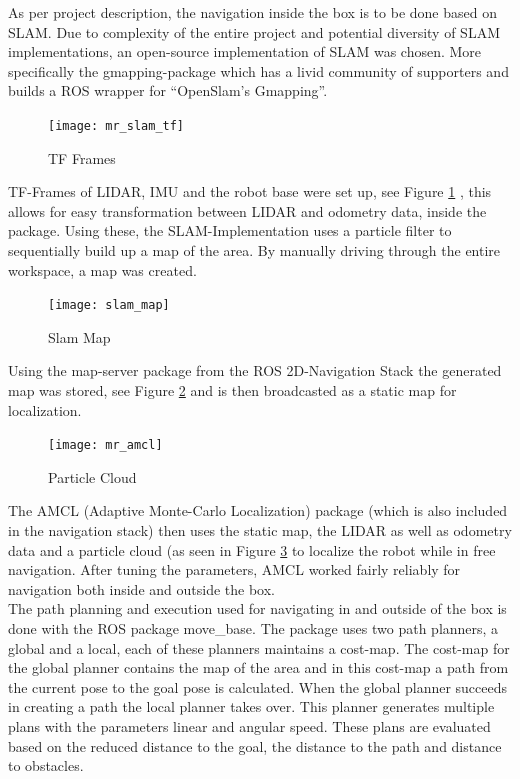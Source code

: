     As per project description, the navigation inside the box is to be done based on SLAM. 
    Due to complexity of the entire project and potential diversity of SLAM implementations, an open-source implementation of SLAM was chosen. 
    More specifically the gmapping-package \cite{gmapping} which has a livid community of supporters and builds a ROS wrapper for “OpenSlam's Gmapping”\cite{openslam}. 
	\begin{figure}[H]
        \centering
        \texttt{[image: mr\_slam\_tf]}
        \caption{TF Frames}
        \label{fig:tf_frames}
    \end{figure}
    TF-Frames of LIDAR, IMU and the robot base were set up, see Figure \ref{fig:tf_frames} , this allows for easy transformation between LIDAR and odometry data, inside the package. 
    Using these, the SLAM-Implementation uses a particle filter to sequentially build up a map of the area. 
    By manually driving through the entire workspace, a map was created. 
    \begin{figure}[H]
        \centering
        \texttt{[image: slam\_map]}
        \caption{Slam Map}
        \label{fig:slam_map}
    \end{figure}
    Using the map-server package from the ROS 2D-Navigation Stack \cite{navigation_stack} the generated map was stored, see Figure \ref{fig:slam_map} and is then broadcasted as a static map for localization.
   \begin{figure}[H]
        \centering
        \texttt{[image: mr\_amcl]}
        \caption{Particle Cloud}
        \label{fig:particle_cloud}
    \end{figure}
    The AMCL (Adaptive Monte-Carlo Localization) package\citep{AMCL} (which is also included in the navigation stack) then uses the static map, the LIDAR as well as odometry data and a particle cloud (as seen in Figure \ref{fig:particle_cloud} to localize the robot while in free navigation. 
    After tuning the parameters, AMCL worked fairly reliably for navigation both inside and outside the box.\\
	The path planning and execution used for navigating in and outside of the box is done with the ROS package move{\_}base\citep{move_base}. The package uses two path planners, a global and a local, each of these planners maintains a cost-map. The cost-map for the global planner contains the map of the area and in this cost-map a path from the current pose to the goal pose is calculated. When the global planner succeeds in creating a path the local planner takes over. This planner generates multiple plans with the parameters linear and angular speed. These plans are evaluated based on the reduced distance to the goal, the distance to the path and distance to obstacles. \\
